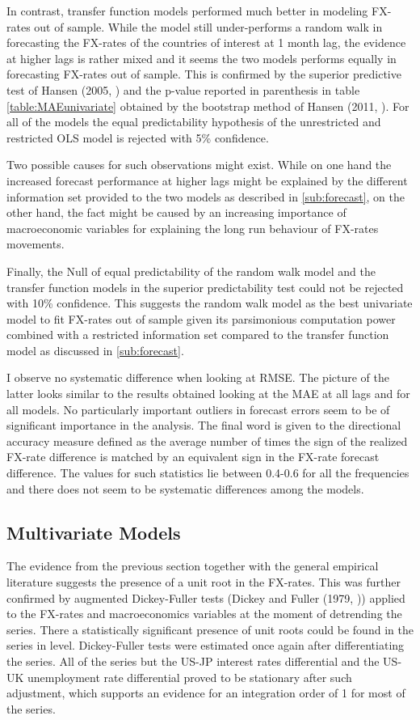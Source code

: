 In contrast, transfer function models performed much better in
modeling FX-rates out of sample. While the model still under-performs a
random walk in forecasting the FX-rates of the countries of interest
at 1 month lag, the evidence at higher lags is rather mixed and it
seems the two models performs equally in forecasting FX-rates out of
sample. This is confirmed by the superior predictive test of Hansen
(2005, \cite{HansenSPA}) and the p-value reported in parenthesis in
table \ref{table:MAEunivariate} obtained by the bootstrap method of
Hansen (2011, \cite{HansenMCS}).  For all of the models the equal
predictability hypothesis of the unrestricted and restricted OLS model
is rejected with 5\% confidence.

Two possible causes for such observations might exist. While on one
hand the increased forecast performance at higher lags might be
explained by the different information set provided to the two models
as described in \ref{sub:forecast}, on the other hand, the fact might
be caused by an increasing importance of macroeconomic variables for
explaining the long run behaviour of FX-rates movements.

Finally, the Null of equal predictability of the random walk model and
the transfer function models in the superior predictability test could
not be rejected with 10\% confidence. This suggests the random walk
model as the best univariate model to fit FX-rates out of sample given
its parsimonious computation power combined with a restricted
information set compared to the transfer function model as discussed
in \ref{sub:forecast}.

I observe no systematic difference when looking at RMSE. The picture
of the latter looks similar to the results obtained looking at the MAE
at all lags and for all models. No particularly important outliers in
forecast errors seem to be of significant importance in the analysis.
The final word is given to the directional accuracy measure defined as
the average number of times the sign of the realized FX-rate
difference is matched by an equivalent sign in the FX-rate forecast
difference. The values for such statistics lie between 0.4-0.6 for all
the frequencies and there does not seem to be systematic differences
among the models. 

\subsection{Multivariate Models}

The evidence from the previous section together with the general
empirical literature suggests the presence of a unit root in the
FX-rates. This was further confirmed by augmented Dickey-Fuller tests
(Dickey and Fuller (1979, \cite{DickeyFuller})) applied to the
FX-rates and macroeconomics variables at the moment of detrending the
series. There a statistically significant presence of unit roots could
be found in the series in level.  Dickey-Fuller tests were estimated
once again after differentiating the series. All of the series but the
US-JP interest rates differential and the US-UK unemployment rate
differential proved to be stationary after such adjustment, which
supports an evidence for an integration order of 1 for most of the
series.

